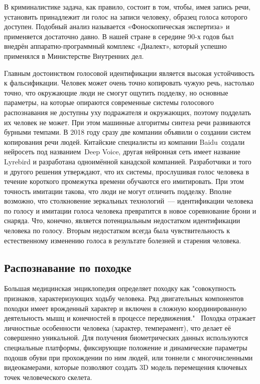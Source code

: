 \documentclass[14pt, a4paper]{extarticle}
\begin{document}
В криминалистике задача, как правило, состоит в том, чтобы, имея запись речи, установить принадлежит ли голос на записи человеку, образец голоса которого доступен. Подобный анализ называется «Фоноскопическая экспертиза» и применяется достаточно давно. В нашей стране в середине 90-х годов был внедрён аппаратно-программный комплекс «Диалект», который успешно применялся в Министерстве Внутренних дел.


Главным достоинством голосовой идентификации является высокая устойчивость к фальсификации. Человек может очень точно копировать чужую речь, настолько точно, что окружающие люди не смогут ощутить подделку, но основные параметры, на которые опираются современные системы голосового распознавания не доступны уху подражателя и окружающих, поэтому подделать их человек не может. При этом машинные алгоритмы синтеза речи развиваются бурными темпами. В 2018 году сразу две компании объявили о создании систем копирования речи людей. Китайские специалисты из компании Baidu создали нейросеть под названием Deep Voice, другая нейронная сеть имеет название Lyrebird и разработана одноимённой канадской компанией. Разработчики и того и другого решения утверждают, что их системы, прослушивая голос человека в течение короткого промежутка времени обучаются его имитировать. При этом точность имитации такова, что люди не могут отличить подделку. Вполне возможно, что столкновение зеркальных технологий~--– идентификации человека по голосу и имитации голоса человека превратится в новое соревнование брони и снаряда. Что, конечно, является потенциальным недостатком идентификации человека по голосу. Вторым недостатком всегда была чувствительность к естественному изменению голоса в результате болезней и старения человека. 
\subsection{Распознавание по походке}
Большая медицинская энциклопедия определяет походку как "совокупность признаков, характеризующих ходьбу человека. Ряд двигательных компонентов походки имеет врожденный характер и включен в сложную координированную деятельность мышц и конечностей в процессе передвижения."\ \cite{petrovskiy1974bme} Походка отражает личностные особенности человека (характер, темперамент), что делает её совершенно уникальной. Для получения биометрических данных используются специальные платформы, фиксирующие положение и динамические параметры подошв обуви при прохождении по ним людей, или тоннели с многочисленными видеокамерами, которые позволяют создать 3D модель перемещения ключевых точек человеческого скелета.
\end{document}
